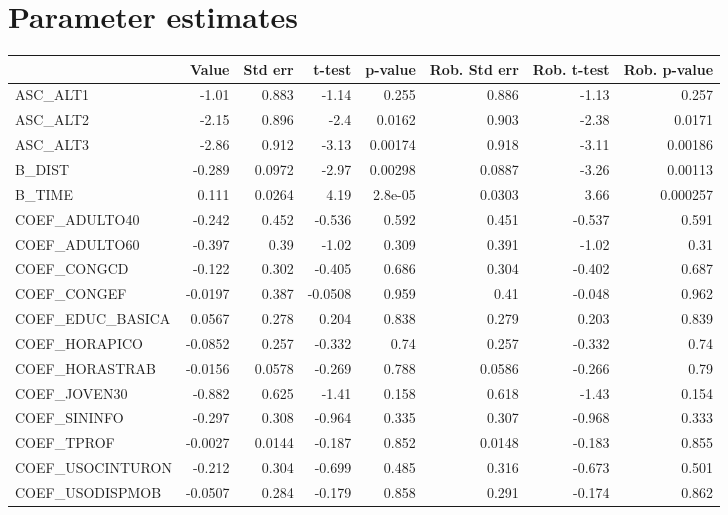 \section{Parameter estimates}
\begin{tabular}{lrrrrrrr}
\toprule
{} &   Value &  Std err &  t-test &  p-value &  Rob. Std err &  Rob. t-test &  Rob. p-value \\
\midrule
ASC\_ALT1         &   -1.01 &    0.883 &   -1.14 &    0.255 &         0.886 &        -1.13 &         0.257 \\
ASC\_ALT2         &   -2.15 &    0.896 &    -2.4 &   0.0162 &         0.903 &        -2.38 &        0.0171 \\
ASC\_ALT3         &   -2.86 &    0.912 &   -3.13 &  0.00174 &         0.918 &        -3.11 &       0.00186 \\
B\_DIST           &  -0.289 &   0.0972 &   -2.97 &  0.00298 &        0.0887 &        -3.26 &       0.00113 \\
B\_TIME           &   0.111 &   0.0264 &    4.19 &  2.8e-05 &        0.0303 &         3.66 &      0.000257 \\
COEF\_ADULTO40    &  -0.242 &    0.452 &  -0.536 &    0.592 &         0.451 &       -0.537 &         0.591 \\
COEF\_ADULTO60    &  -0.397 &     0.39 &   -1.02 &    0.309 &         0.391 &        -1.02 &          0.31 \\
COEF\_CONGCD      &  -0.122 &    0.302 &  -0.405 &    0.686 &         0.304 &       -0.402 &         0.687 \\
COEF\_CONGEF      & -0.0197 &    0.387 & -0.0508 &    0.959 &          0.41 &       -0.048 &         0.962 \\
COEF\_EDUC\_BASICA &  0.0567 &    0.278 &   0.204 &    0.838 &         0.279 &        0.203 &         0.839 \\
COEF\_HORAPICO    & -0.0852 &    0.257 &  -0.332 &     0.74 &         0.257 &       -0.332 &          0.74 \\
COEF\_HORASTRAB   & -0.0156 &   0.0578 &  -0.269 &    0.788 &        0.0586 &       -0.266 &          0.79 \\
COEF\_JOVEN30     &  -0.882 &    0.625 &   -1.41 &    0.158 &         0.618 &        -1.43 &         0.154 \\
COEF\_SININFO     &  -0.297 &    0.308 &  -0.964 &    0.335 &         0.307 &       -0.968 &         0.333 \\
COEF\_TPROF       & -0.0027 &   0.0144 &  -0.187 &    0.852 &        0.0148 &       -0.183 &         0.855 \\
COEF\_USOCINTURON &  -0.212 &    0.304 &  -0.699 &    0.485 &         0.316 &       -0.673 &         0.501 \\
COEF\_USODISPMOB  & -0.0507 &    0.284 &  -0.179 &    0.858 &         0.291 &       -0.174 &         0.862 \\
\bottomrule
\end{tabular}


